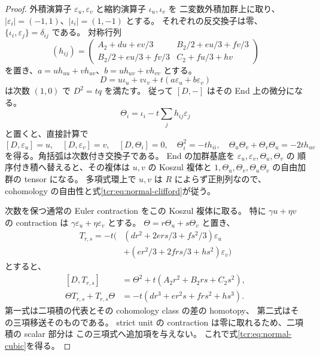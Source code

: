 \begin{proof}
外積演算子 $\varepsilon_u,\varepsilon_v$ と縮約演算子 $\iota_u,\iota_v$ を
二変数外積加群上に取り、
$|\varepsilon_i|=(-1,1)$、$|\iota_i|=(1,-1)$ とする。
それぞれの反交換子は零、$\{\iota_i,\varepsilon_j\}=\delta_{ij}$ である。
対称行列
\[
 (h_{ij})=
 \begin{pmatrix}
 A_2+du+ev/3&B_2/2+eu/3+fv/3\\
 B_2/2+eu/3+fv/3&C_2+fu/3+hv
 \end{pmatrix}
\]
を置き、$a=uh_{uu}+vh_{uv}$、$b=uh_{uv}+vh_{vv}$ とする。
\[
       D=u\iota_u+v\iota_v+t(a\varepsilon_u+b\varepsilon_v)
\]
は次数 $(1,0)$ で $D^2=tq$ を満たす。
従って $[D,-]$ はその End 上の微分になる。
\[
             \Theta_i=\iota_i-t\sum_jh_{ij}\varepsilon_j
\]
と置くと、直接計算で
\[
 [D,\varepsilon_u]=u,\quad [D,\varepsilon_v]=v,
 \quad [D,\Theta_i]=0,
 \quad \Theta_i^2=-th_{ii},\quad
 \Theta_u\Theta_v+\Theta_v\Theta_u=-2th_{uv}
\]
を得る。角括弧は次数付き交換子である。
End の加群基底を $\varepsilon_u,\varepsilon_v,\Theta_u,\Theta_v$ の
順序付き積へ替えると、その複体は $u,v$ の Koszul 複体と
$1,\Theta_u,\Theta_v,\Theta_u\Theta_v$ の自由加群の tensor になる。
多項式環上で $u,v$ は $R$ によらず正則列なので、
cohomology の自由性と式\eqref{tcr:eq:normal-clifford}が従う。

次数を保つ通常の Euler contraction をこの Koszul 複体に取る。
特に $\gamma u+\eta v$ の contraction は
$\gamma\varepsilon_u+\eta\varepsilon_v$ とする。
$\Theta=r\Theta_u+s\Theta_v$ と置き、
\[
 \begin{aligned}
 T_{r,s}=-t\bigl(&
 (dr^2+2ers/3+fs^2/3)\varepsilon_u\\
 &+(er^2/3+2frs/3+hs^2)\varepsilon_v\bigr)
 \end{aligned}
\]
とすると、
\[
 \begin{aligned}
 [D,T_{r,s}]&=\Theta^2+t(A_2r^2+B_2rs+C_2s^2),\\
 \Theta T_{r,s}+T_{r,s}\Theta
       &=-t(dr^3+er^2s+frs^2+hs^3).
 \end{aligned}
\]
第一式は二項積の代表とその cohomology class の差の homotopy、
第二式はその三項移送そのものである。
strict unit の contraction は零に取れるため、二項積の scalar 部分は
この三項式へ追加項を与えない。
これで式\eqref{tcr:eq:normal-cubic}を得る。
\end{proof}

